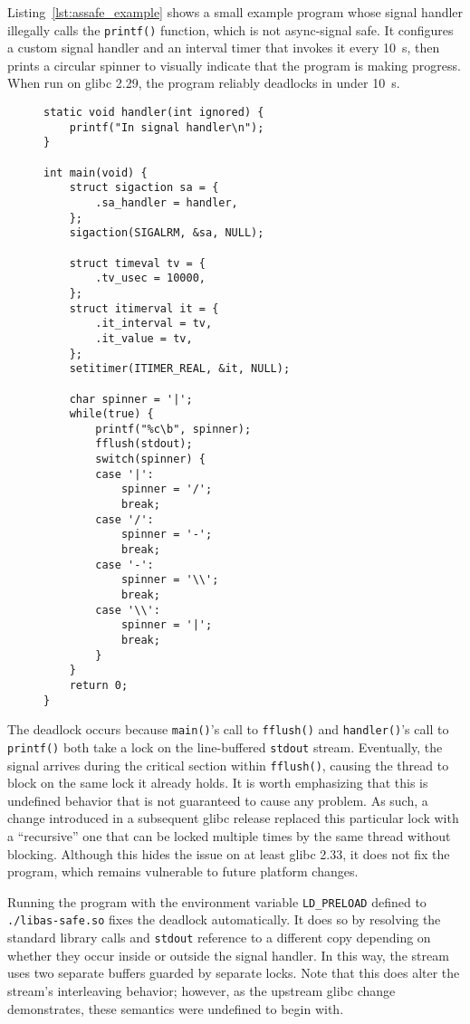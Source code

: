 Listing~\ref{lst:assafe_example} shows a small example program whose signal handler
illegally calls the \texttt{printf()} function, which is not async-signal safe.  It
configures a custom signal handler and an interval timer that invokes it every
10~\textmu{}s, then prints a circular spinner to visually indicate that the program is
making progress.  When run on glibc 2.29, the program reliably deadlocks in under
10~s.

\begin{figure}
\begin{lstlisting}[label=lst:assafe_example,caption=Example program with a signal handler that causes undefined behavior]
static void handler(int ignored) {
	printf("In signal handler\n");
}

int main(void) {
	struct sigaction sa = {
		.sa_handler = handler,
	};
	sigaction(SIGALRM, &sa, NULL);

	struct timeval tv = {
		.tv_usec = 10000,
	};
	struct itimerval it = {
		.it_interval = tv,
		.it_value = tv,
	};
	setitimer(ITIMER_REAL, &it, NULL);

	char spinner = '|';
	while(true) {
		printf("%c\b", spinner);
		fflush(stdout);
		switch(spinner) {
		case '|':
			spinner = '/';
			break;
		case '/':
			spinner = '-';
			break;
		case '-':
			spinner = '\\';
			break;
		case '\\':
			spinner = '|';
			break;
		}
	}
	return 0;
}
\end{lstlisting}
\end{figure}

The deadlock occurs because \texttt{main()}'s call to \texttt{fflush()} and
\texttt{handler()}'s call to \texttt{printf()} both take a lock on the line-buffered
\texttt{stdout} stream.  Eventually, the signal arrives during the critical section
within \texttt{fflush()}, causing the thread to block on the same lock it already
holds.  It is worth emphasizing that this is undefined behavior that is not
guaranteed to cause any problem.  As such, a change introduced in a subsequent glibc
release replaced this particular lock with a ``recursive'' one that can be locked
multiple times by the same thread without blocking.  Although this hides the issue on
at least glibc 2.33, it does not fix the program, which remains vulnerable to future
platform changes.

Running the program with the environment variable \texttt{LD\_PRELOAD} defined to
\texttt{./libas-safe.so} fixes the deadlock automatically.  It does so by resolving
the standard library calls and \texttt{stdout} reference to a different copy
depending on whether they occur inside or outside the signal handler.  In this way,
the stream uses two separate buffers guarded by separate locks.  Note that this does
alter the stream's interleaving behavior; however, as the upstream glibc change
demonstrates, these semantics were undefined to begin with.

